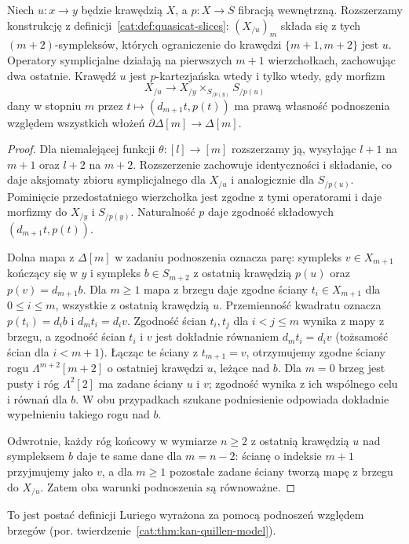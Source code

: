 \begin{stwierdzenie}\label{cat:prop:cartesian-slice-boundary}
Niech $u:x\to y$ będzie krawędzią $X$, a $p:X\to S$ fibracją wewnętrzną. Rozszerzamy konstrukcję z definicji~\ref{cat:def:quasicat-slices}: $(X_{/u})_m$ składa się z tych $(m+2)$-sympleksów, których ograniczenie do krawędzi $\{m+1,m+2\}$ jest $u$. Operatory symplicjalne działają na pierwszych $m+1$ wierzchołkach, zachowując dwa ostatnie. Krawędź $u$ jest $p$-kartezjańska wtedy i tylko wtedy, gdy morfizm
\[
 X_{/u}\longrightarrow X_{/y}\times_{S_{/p(y)}} S_{/p(u)}
\]
dany w stopniu $m$ przez $t\mapsto(d_{m+1}t,p(t))$ ma prawą własność podnoszenia względem wszystkich włożeń $\partial\Delta[m]\to\Delta[m]$.
\end{stwierdzenie}
\begin{proof}
Dla niemalejącej funkcji $\theta:[l]\to[m]$ rozszerzamy ją, wysyłając $l+1$ na $m+1$ oraz $l+2$ na $m+2$. Rozszerzenie zachowuje identyczności i składanie, co daje aksjomaty zbioru symplicjalnego dla $X_{/u}$ i analogicznie dla $S_{/p(u)}$. Pominięcie przedostatniego wierzchołka jest zgodne z tymi operatorami i daje morfizmy do $X_{/y}$ i $S_{/p(y)}$. Naturalność $p$ daje zgodność składowych $(d_{m+1}t,p(t))$.

Dolna mapa z $\Delta[m]$ w zadaniu podnoszenia oznacza parę: sympleks $v\in X_{m+1}$ kończący się w $y$ i sympleks $b\in S_{m+2}$ z ostatnią krawędzią $p(u)$ oraz $p(v)=d_{m+1}b$. Dla $m\geq1$ mapa z brzegu daje zgodne ściany $t_i\in X_{m+1}$ dla $0\leq i\leq m$, wszystkie z ostatnią krawędzią $u$. Przemienność kwadratu oznacza $p(t_i)=d_i b$ i $d_m t_i=d_i v$. Zgodność ścian $t_i,t_j$ dla $i<j\leq m$ wynika z mapy z brzegu, a zgodność ścian $t_i$ i $v$ jest dokładnie równaniem $d_m t_i=d_i v$ (tożsamość ścian dla $i<m+1$). Łącząc te ściany z $t_{m+1}=v$, otrzymujemy zgodne ściany rogu $\Lambda^{m+2}[m+2]$ o ostatniej krawędzi $u$, leżące nad $b$. Dla $m=0$ brzeg jest pusty i róg $\Lambda^2[2]$ ma zadane ściany $u$ i $v$; zgodność wynika z ich wspólnego celu i równań dla $b$. W obu przypadkach szukane podniesienie odpowiada dokładnie wypełnieniu takiego rogu nad $b$.

Odwrotnie, każdy róg końcowy w wymiarze $n\geq2$ z ostatnią krawędzią $u$ nad sympleksem $b$ daje te same dane dla $m=n-2$: ścianę o indeksie $m+1$ przyjmujemy jako $v$, a dla $m\geq1$ pozostałe zadane ściany tworzą mapę z brzegu do $X_{/u}$. Zatem oba warunki podnoszenia są równoważne.
\end{proof}
To jest postać definicji Luriego wyrażona za pomocą podnoszeń względem brzegów (por. twierdzenie~\ref{cat:thm:kan-quillen-model}).

